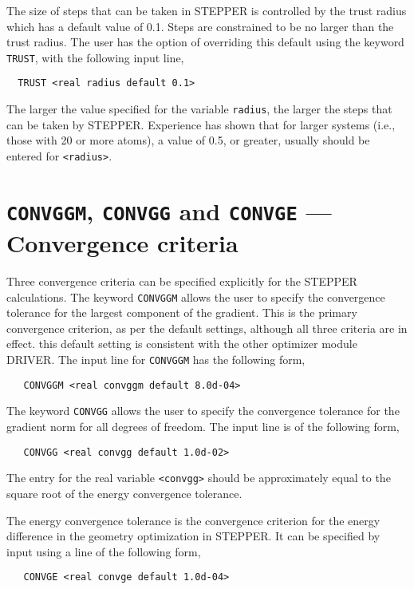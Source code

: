 The size of steps that can be taken in STEPPER is controlled by the
trust radius which has a default value of 0.1.  Steps are constrained
to be no larger than the trust radius.  The user has the option of
overriding this default using the keyword \verb+TRUST+, with the
following input line,
\begin{verbatim}
  TRUST <real radius default 0.1>
\end{verbatim}

The larger the value specified for the variable \verb+radius+, the
larger the steps that can be taken by STEPPER.  Experience has shown
that for larger systems (i.e., those with 20 or more atoms), a value
of 0.5, or greater, usually should be entered for \verb+<radius>+.

\section{{\tt CONVGGM}, {\tt CONVGG} and {\tt CONVGE} --- Convergence criteria}

Three convergence criteria can be specified explicitly for the 
STEPPER calculations.  The keyword \verb+CONVGGM+ allows the user to
specify the convergence tolerance for the largest component of the
gradient. This is the primary convergence criterion, as per the default
settings, although all three criteria are in effect. this default setting
is consistent with the other optimizer module DRIVER. 
The input line for \verb+CONVGGM+ has the following form,
\begin{verbatim}
   CONVGGM <real convggm default 8.0d-04>
\end{verbatim}
The keyword \verb+CONVGG+ allows the user to
specify the convergence tolerance for the gradient norm for
all degrees of freedom.  The input line is of the following form,
\begin{verbatim}
   CONVGG <real convgg default 1.0d-02>
\end{verbatim}
The entry for the real variable \verb+<convgg>+ should be approximately 
equal to the square root of the energy convergence tolerance.

The energy convergence tolerance is the convergence criterion for the 
energy difference in the geometry optimization in STEPPER.  It can be
specified by input using a line of the following form,
\begin{verbatim}
   CONVGE <real convge default 1.0d-04>
\end{verbatim}


